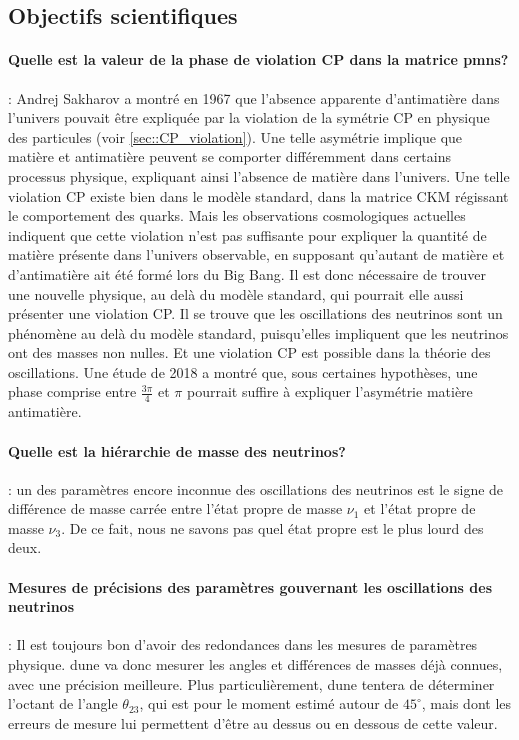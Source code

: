         \subsection{Objectifs scientifiques}\label{sec::dune_pheno}
        
            \paragraph{Quelle est la valeur de la phase de violation CP dans la matrice \gls{pmns}?} : Andrej Sakharov a montré en 1967\cite{Sakharov1967} que l'absence apparente d'antimatière dans l'univers pouvait être expliquée par la violation de la symétrie CP en physique des particules (voir \autoref{sec::CP_violation}). Une telle asymétrie implique que matière et antimatière peuvent se comporter différemment dans certains processus physique, expliquant ainsi l'absence de matière dans l'univers. Une telle violation CP existe bien dans le modèle standard, dans la matrice CKM régissant le comportement des quarks. Mais les observations cosmologiques actuelles\cite{Bari2012} indiquent que cette violation n'est pas suffisante pour expliquer la quantité de matière présente dans l'univers observable, en supposant qu'autant de matière et d'antimatière ait été formé lors du Big Bang. Il est donc nécessaire de trouver une nouvelle physique, au delà du modèle standard, qui pourrait elle aussi présenter une violation CP. Il se trouve que les oscillations des neutrinos sont un phénomène au delà du modèle standard, puisqu'elles impliquent que les neutrinos ont des masses non nulles. Et une violation CP est possible dans la théorie des oscillations. Une étude de 2018\cite{Bucella2018} a montré que, sous certaines hypothèses, une phase comprise entre $\frac{3\pi}{4}$ et $\pi$ pourrait suffire à expliquer l'asymétrie matière antimatière.
            
            \paragraph{Quelle est la hiérarchie de masse des neutrinos?} : un des paramètres encore inconnue des oscillations des neutrinos est le signe de différence de masse carrée entre l'état propre de masse $\nu_1$ et l'état propre de masse $\nu_3$. De ce fait, nous ne savons pas quel état propre est le plus lourd des deux.
            
            \paragraph{Mesures de précisions des paramètres gouvernant les oscillations des neutrinos} : Il est toujours bon d'avoir des redondances dans les mesures de paramètres physique. \gls{dune} va donc mesurer les angles et différences de masses déjà connues, avec une précision meilleure. Plus particulièrement, \gls{dune} tentera de déterminer l'octant de l'angle $\theta_{23}$, qui est pour le moment estimé autour de $45^{\circ}$, mais dont les erreurs de mesure lui permettent d'être au dessus ou en dessous de cette valeur\cite{citation_needed}.
            
